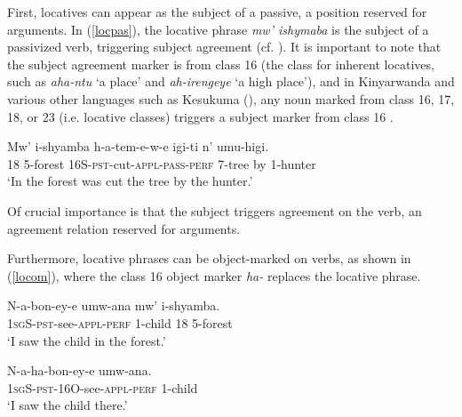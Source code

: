 \documentclass[output=paper]{langsci/langscibook}
\begin{document}
 
First, locatives can appear as the subject of a passive, a position reserved for arguments. In (\ref{locpas}), the locative phrase \emph{mw' ishymaba} is the subject of a passivized verb, triggering subject agreement (cf. \citealt{BresnanKanerva1989,bresnan:1994}). It is important to note that the subject agreement marker is from class 16 (the class for inherent locatives, such as \emph{aha-ntu} `a place' and \emph{ah-irengeye} `a high place'), and in Kinyarwanda and various other languages such as Kesukuma ({\citealt[245]{batibo:1985}}), any noun marked from class 16, 17, 18, or 23 (i.e. locative classes) triggers a subject marker from class 16  \citep{maho:1999}.


\begin{exe}

	\ex\label{locpas}\gll Mw' i-shyamba h-a-tem-e-w-e igi-ti n' umu-higi.\\
			{\scshape 18} 5-forest 16S-{\scshape pst}-cut-{\scshape appl-pass-perf} 7-tree by 1-hunter\\
			\glt `In the forest was cut the tree by the hunter.'

\end{exe}
%
 Of crucial importance is that the subject triggers agreement on the verb, an agreement relation reserved for arguments.  



Furthermore, locative phrases can be object-marked on verbs, as shown in (\ref{locom}), where the class 16 object marker \emph{ha-} replaces the locative phrase. 

\begin{exe}
	\ex\begin{xlist}
	\ex\label{loco}\gll N-a-bon-ey-e umw-ana mw' i-shyamba.\\
					1{\scshape sg}S-{\scshape pst}-see-{\scshape appl-perf} 1-child 18 5-forest\\
					\glt `I saw the child in the forest.'
					
	\ex\label{locom}\gll N-a-ha-bon-ey-e umw-ana.\\
			1{\scshape sg}S-{\scshape pst-16O}-see-{\scshape appl-perf} 1-child\\
			\glt `I saw the child there.'
	\end{xlist}
\end{exe}

 
 
\end{document}
